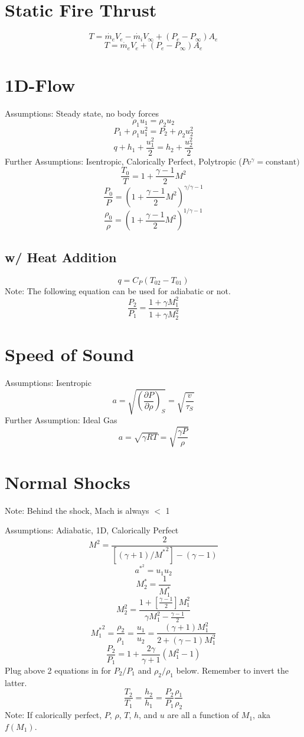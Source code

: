 \documentclass{article}
\begin{document}
\section{Static Fire Thrust}
\[ T = \dot{m_e} V_e - \dot{m_i} V_\infty + (P_e - P_\infty) A_e \tag{Jet} \]
\[ T = \dot{m_e} V_e + (P_e - P_\infty) A_e \tag{Rocket} \]

\section{1D-Flow}
Assumptions: Steady state, no body forces
\[ \rho_1 u_1 = \rho_2 u_2 \tag{Continuity} \]
\[ P_1 + \rho_1 u_1^2 = P_2 + \rho_2 u_2^2 \tag{Momentum} \]
\[ q + h_1 + \frac{u_1^2}{2} = h_2 + \frac{u_2^2}{2} \tag{Energy} \]
Further Assumptions: Isentropic, Calorically Perfect, Polytropic ($Pv^\gamma=\text{constant})$
\[ \frac{T_0}{T} = 1 + \frac{\gamma-1}{2} M^2 \]
\[ \frac{P_0}{P} = \left( 1 + \frac{\gamma-1}{2} M^2 \right)^{\gamma/\gamma-1} \]
\[ \frac{\rho_0}{\rho} = \left( 1 + \frac{\gamma-1}{2} M^2 \right)^{1/\gamma-1} \]

\subsection{w/ Heat Addition}
\[ q = C_P (T_{02} - T_{01}) \]
Note: The following equation can be used for adiabatic or not. 
\[ \frac{P_2}{P_1} = \frac{1+\gamma M_1^2}{1+\gamma M_2^2} \]

\section{Speed of Sound}
Assumptions: Isentropic
\[ a = \sqrt{\left( \frac{\partial P}{\partial \rho} \right)_S} = \sqrt{\frac{v}{\tau_S}} \]
Further Assumption: Ideal Gas
\[ a = \sqrt{\gamma RT} = \sqrt{ \frac{\gamma P}{\rho} } \]

\section{Normal Shocks}
Note: Behind the shock, Mach is always $<$ 1

Assumptions: Adiabatic, 1D, Calorically Perfect
\[ M^2 = \frac{2}{\left[ (\gamma+1)/{M^*}^2 \right] - (\gamma-1)} \]
\[ a^{*^2} = u_1 u_2 \tag{Prandtl Relation} \]
\[ M_2^* = \frac{1}{M_1^*} \]
\[ M_2^2 = \frac{1+[\frac{\gamma-1}{2}] M_1^2}{\gamma M_1^2 - \frac{\gamma-1}{2}} \]
\[ {M_1^*}^2 = \frac{\rho_2}{\rho_1} = \frac{u_1}{u_2} = \frac{(\gamma+1)M_1^2}{2+(\gamma-1)M_1^2} \]
\[ \frac{P_2}{P_1} = 1 +\frac{2\gamma}{\gamma+1}(M_1^2-1) \]
Plug above 2 equations in for $P_2/P_1$ and $\rho_2/\rho_1$ below. Remember to invert the latter.
\[ \frac{T_2}{T_1} = \frac{h_2}{h_1} = \frac{P_2}{P_1} \frac{\rho_1}{\rho_2} \]
Note: If calorically perfect, $P$, $\rho$, $T$, $h$, and $u$ are all a function of $M_1$, aka $ f(M_1) $.
\end{document}
